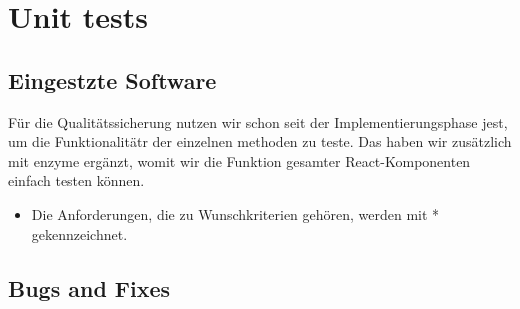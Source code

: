\section{Unit tests}

\subsection{Eingestzte Software}

Für die Qualitätssicherung nutzen wir schon seit der Implementierungsphase jest, um die Funktionalitätr der einzelnen methoden zu teste. Das haben wir zusätzlich mit enzyme ergänzt, womit wir die Funktion gesamter React-Komponenten einfach testen können.

\begin{itemize}
  \item Die Anforderungen, die zu Wunschkriterien gehören, werden mit * gekennzeichnet.
\end{itemize}

\setcounter{counter}{10}

\subsection{Bugs and Fixes}




